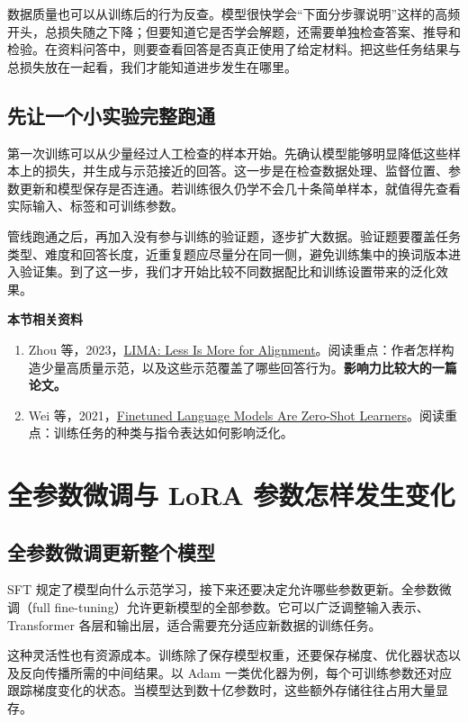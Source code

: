 数据质量也可以从训练后的行为反查。模型很快学会“下面分步骤说明”这样的高频开头，总损失随之下降；但要知道它是否学会解题，还需要单独检查答案、推导和检验。在资料问答中，则要查看回答是否真正使用了给定材料。把这些任务结果与总损失放在一起看，我们才能知道进步发生在哪里。

\subsection{先让一个小实验完整跑通}

第一次训练可以从少量经过人工检查的样本开始。先确认模型能够明显降低这些样本上的损失，并生成与示范接近的回答。这一步是在检查数据处理、监督位置、参数更新和模型保存是否连通。若训练很久仍学不会几十条简单样本，就值得先查看实际输入、标签和可训练参数。

管线跑通之后，再加入没有参与训练的验证题，逐步扩大数据。验证题要覆盖任务类型、难度和回答长度，近重复题应尽量分在同一侧，避免训练集中的换词版本进入验证集。到了这一步，我们才开始比较不同数据配比和训练设置带来的泛化效果。

\textbf{本节相关资料}
\begin{enumerate}
    \item Zhou 等，2023，\href{https://arxiv.org/abs/2305.11206}{LIMA: Less Is More for Alignment}。阅读重点：作者怎样构造少量高质量示范，以及这些示范覆盖了哪些回答行为。\textbf{影响力比较大的一篇论文。}
    \item Wei 等，2021，\href{https://arxiv.org/abs/2109.01652}{Finetuned Language Models Are Zero-Shot Learners}。阅读重点：训练任务的种类与指令表达如何影响泛化。
\end{enumerate}

\section{全参数微调与 LoRA 参数怎样发生变化}\label{全参数微调与LoRA}

\subsection{全参数微调更新整个模型}

SFT 规定了模型向什么示范学习，接下来还要决定允许哪些参数更新。全参数微调（full fine-tuning）允许更新模型的全部参数。它可以广泛调整输入表示、Transformer 各层和输出层，适合需要充分适应新数据的训练任务。

这种灵活性也有资源成本。训练除了保存模型权重，还要保存梯度、优化器状态以及反向传播所需的中间结果。以 Adam 一类优化器为例，每个可训练参数还对应跟踪梯度变化的状态。当模型达到数十亿参数时，这些额外存储往往占用大量显存。

